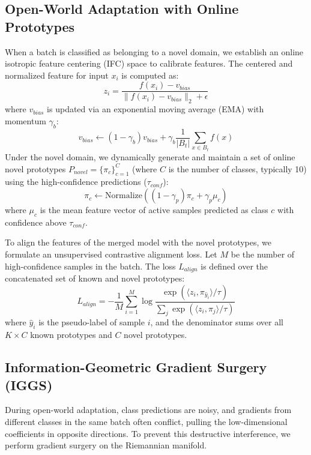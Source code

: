 \documentclass{article}
\theoremstyle{plain}
\theoremstyle{definition}
\theoremstyle{remark}
\begin{document}
\subsection{Open-World Adaptation with Online Prototypes}
When a batch is classified as belonging to a novel domain, we establish an online isotropic feature centering (IFC) space to calibrate features. The centered and normalized feature for input $x_i$ is computed as:
\begin{equation}
  z_i = \frac{f(x_i) - v_{bias}}{\|f(x_i) - v_{bias}\|_2 + \epsilon}
\end{equation}
where $v_{bias}$ is updated via an exponential moving average (EMA) with momentum $\gamma_b$:
\begin{equation}
  v_{bias} \leftarrow (1-\gamma_b) v_{bias} + \gamma_b \frac{1}{|B_t|} \sum_{x \in B_t} f(x)
\end{equation}
Under the novel domain, we dynamically generate and maintain a set of online novel prototypes $P_{novel} = \{\pi_c\}_{c=1}^C$ (where $C$ is the number of classes, typically 10) using the high-confidence predictions ($\tau_{conf}$):
\begin{equation}
  \pi_c \leftarrow \text{Normalize}\left( (1-\gamma_p) \pi_c + \gamma_p \mu_c \right)
\end{equation}
where $\mu_c$ is the mean feature vector of active samples predicted as class $c$ with confidence above $\tau_{conf}$.

To align the features of the merged model with the novel prototypes, we formulate an unsupervised contrastive alignment loss. Let $M$ be the number of high-confidence samples in the batch. The loss $L_{align}$ is defined over the concatenated set of known and novel prototypes:
\begin{equation}
  L_{align} = -\frac{1}{M} \sum_{i=1}^M \log \frac{\exp\left( \langle z_i, \pi_{\hat{y}_i} \rangle / \tau \right)}{\sum_{j} \exp\left( \langle z_i, \pi_j \rangle / \tau \right)}
\end{equation}
where $\hat{y}_i$ is the pseudo-label of sample $i$, and the denominator sums over all $K \times C$ known prototypes and $C$ novel prototypes.

\subsection{Information-Geometric Gradient Surgery (IGGS)}
During open-world adaptation, class predictions are noisy, and gradients from different classes in the same batch often conflict, pulling the low-dimensional coefficients in opposite directions. To prevent this destructive interference, we perform gradient surgery on the Riemannian manifold.
\end{document}
